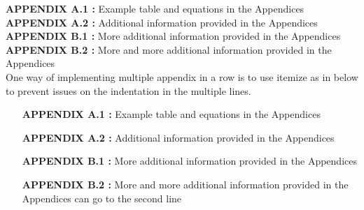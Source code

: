 \singlespacing
\textbf{APPENDIX A.1 :} Example table and equations in the Appendices\\
\textbf{APPENDIX A.2 :} Additional information provided in the Appendices\\
\textbf{APPENDIX B.1 :} More additional information provided in the Appendices\\
\textbf{APPENDIX B.2 :} More and more additional information provided in the Appendices\\

One way of implementing multiple appendix in a row is to use itemize as in below to prevent issues on the indentation in the multiple lines.

\begin{itemize}[leftmargin=3.3cm,itemsep=-0.4em,labelsep=1.5mm] %
\item [\textbf{APPENDIX A.1 :}]Example table and equations in the Appendices
\item [\textbf{APPENDIX A.2 :}]Additional information provided in the Appendices
\item [\textbf{APPENDIX B.1 :}]More additional information provided in the Appendices
\item [\textbf{APPENDIX B.2 :}]More and more additional information provided in the Appendices can go to the second line
\end{itemize}

\newpage